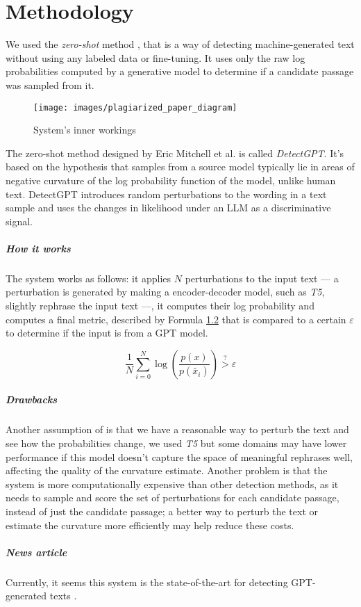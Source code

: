 \chapter{Methodology}

We used the \textit{zero-shot} method \cite{mitchell2023detectgpt}, that is  a way of detecting machine-generated text without using any labeled data or fine-tuning. It uses only the raw log probabilities computed by a generative model to determine if a candidate passage was sampled from it.

\begin{figure}[H]
	\centering
	\texttt{[image: images/plagiarized\_paper\_diagram]}
	\caption{System's inner workings}
	\label{fig:plagiarizedpaperdiagram}
\end{figure}

The zero-shot method designed by Eric Mitchell et al. is called \textit{DetectGPT}. It's based on the hypothesis that samples from a source model typically lie in areas of negative curvature of the log probability function of the model, unlike human text. DetectGPT introduces random perturbations to the wording in a text sample and uses the changes in likelihood under an LLM as a discriminative signal.

\paragraph{How it works}
The system works as follows: it applies $N$ perturbations to the input text --- a perturbation is generated by making a encoder-decoder model, such as \textit{T5}, slightly rephrase the input text ---, it computes their log probability and computes a final metric, described by Formula \ref{formula:logprobmetric} that is compared to a certain $\varepsilon$ to determine if the input is from a GPT model.

\begin{figure}[H]
	\centering
	\label{formula:logprobmetric}
	\begin{equation}
		\dfrac{1}{N} \sum_{i = 0}^{N}
		\log\left(
		\dfrac{p(x)}{p(\tilde{x_i})}
		\right)
		\stackrel{?}{>}
		\varepsilon
	\end{equation}
\end{figure}

\paragraph{Drawbacks}
Another assumption of is that we have a reasonable way to perturb the text and see how the probabilities change, we used \textit{T5} but some domains may have lower performance if this model doesn't capture the space of meaningful rephrases well, affecting the quality of the curvature estimate. Another problem is that the system is more computationally expensive than other detection methods, as it needs to sample and score the set of perturbations for each candidate passage, instead of just the candidate passage; a better way to perturb the text or estimate the curvature more efficiently may help reduce these costs.

\paragraph{News article}
Currently, it seems this system is the state-of-the-art for detecting GPT-generated texts \cite{state-of-the-art-article}.